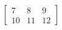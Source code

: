 \documentclass[preview]{standalone}
\begin{document}
\begin{align*}
\begin{bmatrix} 7 & 8 & 9 \\ 10 & 11 & 12 \end{bmatrix}
\end{align*}
\end{document}
